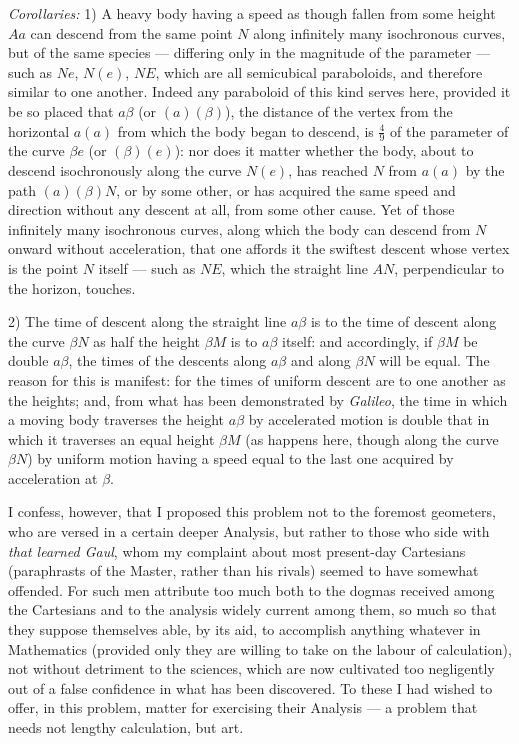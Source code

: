\documentclass{article}
\begin{document}
\emph{Corollaries:} 1) A heavy body having a speed as though fallen from some height $Aa$ can
descend from the same point $N$ along infinitely many isochronous curves, but of the same species
— differing only in the magnitude of the parameter — such as $Ne$, $N(e)$, $NE$, which are all
semicubical paraboloids, and therefore similar to one another. Indeed any paraboloid of this kind
serves here, provided it be so placed that $a\beta$ (or $(a)(\beta)$), the distance of the vertex
from the horizontal $a(a)$ from which the body began to descend, is $\frac{4}{9}$ of the parameter
of the curve $\beta e$ (or $(\beta)(e)$): nor does it matter whether the body, about to descend
isochronously along the curve $N(e)$, has reached $N$ from $a(a)$ by the path $(a)(\beta)N$, or by
some other, or has acquired the same speed and direction without any descent at all, from some
other cause. Yet of those infinitely many isochronous curves, along which the body can descend
from $N$ onward without acceleration, that one affords it the swiftest descent whose vertex is the
point $N$ itself — such as $NE$, which the straight line $AN$, perpendicular to the horizon,
touches.

2) The time of descent along the straight line $a\beta$ is to the time of descent along the curve
$\beta N$ as half the height $\beta M$ is to $a\beta$ itself: and accordingly, if $\beta M$ be
double $a\beta$, the times of the descents along $a\beta$ and along $\beta N$ will be equal. The
reason for this is manifest: for the times of uniform descent are to one another as the heights;
and, from what has been demonstrated by \emph{Galileo}, the time in which a moving body traverses
the height $a\beta$ by accelerated motion is double that in which it traverses an equal height
$\beta M$ (as happens here, though along the curve $\beta N$) by uniform motion having a speed
equal to the last one acquired by acceleration at $\beta$.

I confess, however, that I proposed this problem not to the foremost geometers, who are versed in
a certain deeper Analysis, but rather to those who side with \emph{that learned Gaul}, whom my
complaint about most present-day Cartesians (paraphrasts of the Master, rather than his rivals)
seemed to have somewhat offended. For such men attribute too much both to the dogmas received
among the Cartesians and to the analysis widely current among them, so much so that they suppose
themselves able, by its aid, to accomplish anything whatever in Mathematics
(provided only they are willing to take on the labour of calculation), not without detriment to
the sciences, which are now cultivated too negligently out of a false confidence in what has been
discovered. To these I had wished to offer, in this problem, matter for exercising their Analysis
— a problem that needs not lengthy calculation, but art.
\end{document}
